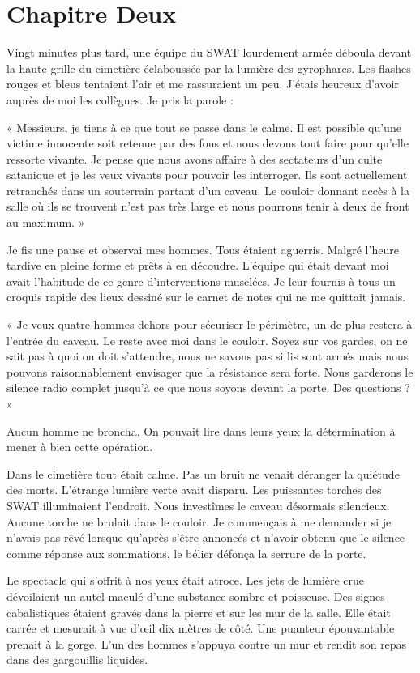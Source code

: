 \chapter[Chapitre Deux]{Chapitre Deux}
Vingt minutes plus tard, une équipe du SWAT lourdement armée déboula devant la haute grille du cimetière éclaboussée 
par la lumière des gyrophares. Les flashes rouges et bleus tentaient l'air et me rassuraient un peu. J'étais heureux 
d'avoir auprès de moi les collègues. Je pris la parole :

« Messieurs, je tiens à ce que tout se passe dans le calme. Il est possible qu'une victime innocente soit retenue par 
des fous et nous devons tout faire pour qu'elle ressorte vivante. Je pense que nous avons affaire à des sectateurs d'un 
culte satanique et je les veux vivants pour pouvoir les interroger. Ils sont actuellement retranchés dans un souterrain 
partant d'un caveau. Le couloir donnant accès à la salle où ils se trouvent n'est pas très large et nous pourrons tenir 
à deux de front au maximum. »

Je fis une pause et observai mes hommes. Tous étaient aguerris. Malgré l'heure tardive en pleine forme et prêts à en 
découdre. L'équipe qui était devant moi avait l'habitude de ce genre d'interventions musclées. Je leur fournis à tous 
un croquis rapide des lieux dessiné sur le carnet de notes qui ne me quittait jamais.

« Je veux quatre hommes dehors pour sécuriser le périmètre, un de plus restera à l'entrée du caveau. Le reste avec moi 
dans le couloir. Soyez sur vos gardes, on ne sait pas à quoi on doit s'attendre, nous ne savons pas si lis sont armés 
mais nous pouvons raisonnablement envisager que la résistance sera forte. Nous garderons le silence radio complet 
jusqu'à ce que nous soyons devant la porte. Des questions ? »

Aucun homme ne broncha. On pouvait lire dans leurs yeux la détermination à mener à bien cette opération.

Dans le cimetière tout était calme. Pas un bruit ne venait déranger la quiétude des morts. L'étrange lumière verte 
avait disparu. Les puissantes torches des SWAT illuminaient l'endroit. Nous investîmes le caveau désormais silencieux. 
Aucune torche ne brulait dans le couloir. Je commençais à me demander si je n'avais pas rêvé lorsque qu'après s'être 
annoncés et n'avoir obtenu que le silence comme réponse aux sommations, le bélier défonça la serrure de la porte.

Le spectacle qui s'offrit à nos yeux était atroce. Les jets de lumière crue dévoilaient un autel maculé d'une substance 
sombre et poisseuse. Des signes cabalistiques étaient gravés dans la pierre et sur les mur de la salle. Elle était 
carrée et mesurait à vue d'œil dix mètres de côté. Une puanteur épouvantable prenait à la gorge. L'un des hommes 
s'appuya contre un mur et rendit son repas dans des gargouillis liquides.


